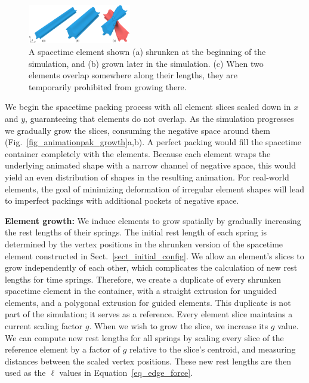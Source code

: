 \begin{figure}
\centering
\includegraphics[width=0.4\textwidth]{figures/animationpak/growth.pdf} 
\caption[Element growths]
{\label{fig_animationpakgrowth} 
A spacetime element shown (a) shrunken at the beginning of the simulation,
and (b) grown later in the simulation. (c) When two elements overlap
somewhere along their lengths, they are temporarily prohibited from growing
there.
}
\end{figure}

We begin the spacetime packing process with all element slices scaled
down in $x$ and $y$, guaranteeing that elements do not 
overlap.  As the simulation progresses we gradually grow the slices, 
consuming the negative space around them (Fig.~\ref{fig_animationpak_growth}a,b).
A perfect packing would fill the spacetime container completely with the elements.
Because each element wraps the underlying animated shape with a narrow channel
of negative space, this would yield an even
distribution of shapes in the resulting animation.
For real-world elements, the goal of minimizing deformation of irregular 
element shapes will lead to imperfect packings with additional pockets
of negative space.


\textbf{Element growth:}
We induce elements to grow spatially by gradually increasing the rest 
lengths of their springs.
The initial rest length of each spring is determined by the vertex positions in
the shrunken version of the spacetime element constructed in 
Sect.~\ref{sect_initial_config}.
We allow an element's slices to grow independently of each other, which
complicates the calculation of new rest lengths for time springs.
Therefore, we create a duplicate of every shrunken spacetime element
in the container, with a straight extrusion
for unguided elements, and a polygonal extrusion for guided elements.
This duplicate is not part of the simulation; it serves as a reference.
Every element slice maintains a current scaling factor $g$.
When we wish to grow the slice, we increase its $g$ value.
We can compute new rest lengths for all springs by scaling every slice
of the reference element by a factor of $g$ relative to the
slice's centroid, and measuring distances between the scaled vertex
positions.  These new rest lengths are then used as the $\ell$ values
in Equation~\ref{eq_edge_force}.

